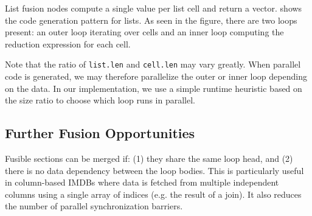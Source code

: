 List fusion nodes compute a single value per list cell and return a vector.  shows the code generation pattern for lists. As seen in
the figure, there are two loops present: an outer loop iterating over cells and an
inner loop computing the reduction expression for each cell.


Note that the ratio of \texttt{list.len} and \texttt{cell.len} may vary greatly.
When parallel code is generated, we may therefore parallelize the outer or inner loop
depending on the data. In our implementation, we use a simple runtime heuristic based
on the size ratio to choose which loop runs in parallel.

\subsection{Further Fusion Opportunities}

Fusible sections can be merged if:
(1) they share the same loop head, and
(2) there is no data dependency between the loop bodies.
This is particularly useful in column-based IMDBs where data is fetched
from multiple independent columns using a single array of indices (e.g. the result
of a join). It also reduces the number of parallel synchronization barriers.

